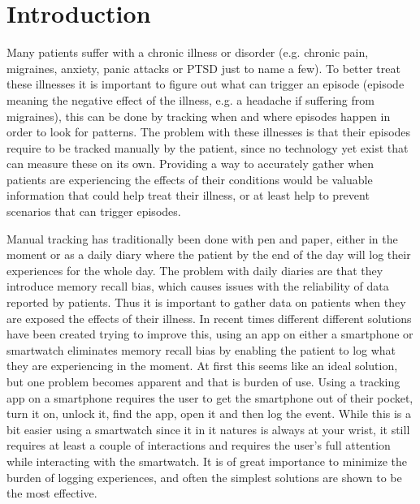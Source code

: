 \chapter{Introduction}
Many patients suffer with a chronic illness or disorder (e.g. chronic pain\cite{chronic_pain}, migraines\cite{migrane}, anxiety\cite{anxiety}, panic attacks\cite{panic_attack} or PTSD\cite{ptsd_stats} just to name a few). To better treat these illnesses it is important to figure out what can trigger an episode (episode meaning the negative effect of the illness, e.g. a headache if suffering from migraines), this can be done by tracking when and where episodes happen in order to look for patterns. The problem with these illnesses is that their episodes require to be tracked manually by the patient, since no technology yet exist that can measure these on its own. Providing a way to accurately gather when patients are experiencing the effects of their conditions would be valuable information that could help treat their illness, or at least help to prevent scenarios that can trigger episodes. 

Manual tracking has traditionally been done with pen and paper, either in the moment or as a daily diary where the patient by the end of the day will log their experiences for the whole day. The problem with daily diaries are that they introduce memory recall bias\cite{recall_bias}, which causes issues with the reliability of data reported by patients. Thus it is important to gather data on patients when they are exposed the effects of their illness. In recent times different different solutions have been created trying to improve this, using an app on either a smartphone or smartwatch eliminates memory recall bias by enabling the patient to log what they are experiencing in the moment. At first this seems like an ideal solution, but one problem becomes apparent and that is burden of use. Using a tracking app on a smartphone requires the user to get the smartphone out of their pocket, turn it on, unlock it, find the app, open it and then log the event. While this is a bit easier using a smartwatch since it in it natures is always at your wrist, it still requires at least a couple of interactions and requires the user's full attention while interacting with the smartwatch. It is of great importance to minimize the burden of logging experiences, and often the simplest solutions are shown to be the most effective.

